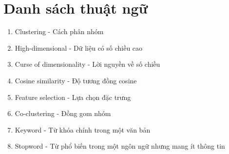 \chapter*{Danh sách thuật ngữ}
\label{Appendix:Terminologies}

\begin{enumerate}
\item Clustering - Cách phân nhóm
\item High-dimensional - Dữ liệu có số chiều cao
\item Curse of dimensionality - Lời nguyền về số chiều
\item Cosine similarity - Độ tương đồng cosine
\item Feature selection - Lựa chọn đặc trưng
\item Co-clustering - Đồng gom nhóm
\item Keyword - Từ khóa chính trong một văn bản
\item Stopword - Từ phổ biến trong một ngôn ngữ nhưng mang ít thông tin
\end{enumerate}